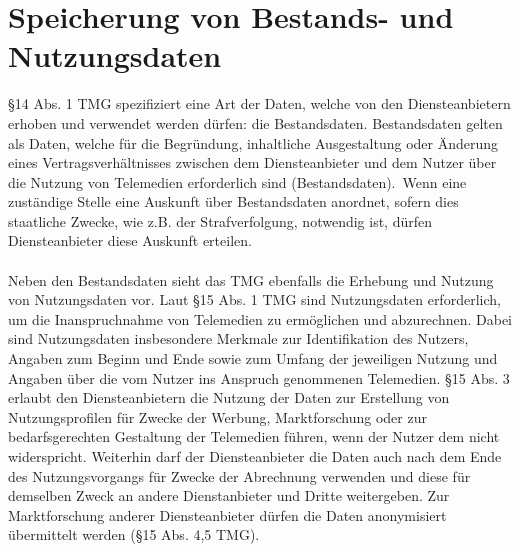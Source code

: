 \section{Speicherung von Bestands- und Nutzungsdaten}
\S 14 Abs. 1 TMG spezifiziert eine Art der Daten, welche von den Diensteanbietern erhoben und verwendet werden dürfen: die Bestandsdaten. Bestandsdaten gelten als Daten, welche \glqq für die Begründung, inhaltliche Ausgestaltung oder Änderung eines Vertragsverhältnisses zwischen dem Diensteanbieter und dem Nutzer über die Nutzung von Telemedien erforderlich sind (Bestandsdaten).\grqq \ Wenn eine zuständige Stelle eine Auskunft über Bestandsdaten anordnet, sofern dies staatliche Zwecke, wie z.B. der Strafverfolgung, notwendig ist, dürfen Diensteanbieter diese Auskunft erteilen.\\
\\Neben den Bestandsdaten sieht das TMG ebenfalls die Erhebung und Nutzung von Nutzungsdaten vor. Laut \S 15 Abs. 1 TMG sind Nutzungsdaten erforderlich, um die Inanspruchnahme von Telemedien zu ermöglichen und abzurechnen. Dabei sind Nutzungsdaten insbesondere Merkmale zur Identifikation des Nutzers, Angaben zum Beginn und Ende sowie zum Umfang der jeweiligen Nutzung und Angaben über die vom Nutzer ins Anspruch genommenen Telemedien. \S 15 Abs. 3 erlaubt den Diensteanbietern die Nutzung der Daten zur Erstellung von Nutzungsprofilen für Zwecke der Werbung, Marktforschung oder zur bedarfsgerechten Gestaltung der Telemedien führen, wenn der Nutzer dem nicht widerspricht. Weiterhin darf der Diensteanbieter die Daten auch nach dem Ende des Nutzungsvorgangs für Zwecke der Abrechnung verwenden und diese für demselben Zweck an andere Dienstanbieter und Dritte weitergeben. Zur Marktforschung anderer Diensteanbieter dürfen die Daten anonymisiert übermittelt werden (\S 15 Abs. 4,5 TMG).\\
